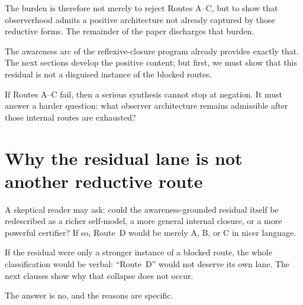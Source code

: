 \documentclass[11pt]{article}
\theoremstyle{plain}
\theoremstyle{definition}
\theoremstyle{remark}
\begin{document}
The burden is therefore not merely to reject Routes A--C, but to show that
observerhood admits a positive architecture not already captured by those
reductive forms.  The remainder of the paper discharges that burden.

The awareness arc of the reflexive-closure program already provides
exactly that.  The next sections develop the positive content; but first,
we must show that this residual is not a disguised instance of the blocked
routes.

\begin{keybox}[title={The positive burden}]
If Routes A--C fail, then a serious synthesis cannot stop at negation.  It
must answer a harder question: what observer architecture remains
admissible after those internal routes are exhausted?
\end{keybox}

\section{Why the residual lane is not another reductive route}
\label{sec:not-reductive}

A skeptical reader may ask: could the awareness-grounded residual itself
be redescribed as a richer self-model, a more general internal closure, or
a more powerful certifier?  If so, Route~D would be merely A, B, or C in
nicer language.

\begin{keybox}[title={The collapse worry}]
If the residual were only a stronger instance of a blocked route, the
whole classification would be verbal: ``Route~D'' would not deserve its
own lane.  The next clauses show why that collapse does not occur.
\end{keybox}

The answer is no, and the reasons are specific.
\end{document}
